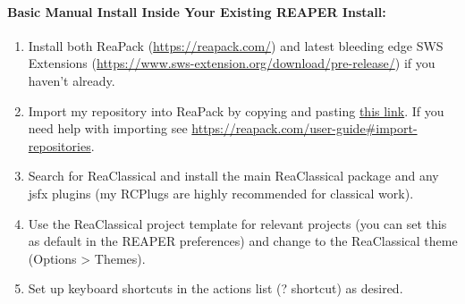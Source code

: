 \documentclass[british]{article}
\begin{document}
\paragraph{Basic Manual Install Inside Your Existing REAPER Install:}
\begin{enumerate}
\item Install both ReaPack (\href{https://reapack.com/}{https://reapack.com/})
and latest bleeding edge SWS Extensions (\href{https://www.sws-extension.org/download/pre-release/}{https://www.sws-extension.org/download/pre-release/})
if you haven't already. 
\item Import my repository into ReaPack by copying and pasting \href{https://github.com/chmaha/ReaClassical/raw/main/index.xml}{this link}.
If you need help with importing see \href{https://reapack.com/user-guide\#import-repositories}{https://reapack.com/user-guide\#import-repositories}. 
\item Search for \textquotedbl ReaClassical\textquotedbl{} and install
the main ReaClassical package and any jsfx plugins (my \textquotedbl RCPlugs\textquotedbl{}
are highly recommended for classical work). 
\item Use the ReaClassical project template for relevant projects (you can
set this as default in the REAPER preferences) and change to the ReaClassical
theme (Options > Themes). 
\item Set up keyboard shortcuts in the actions list (? shortcut) as desired.
\end{enumerate}
\end{document}
